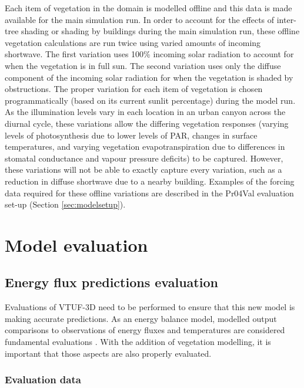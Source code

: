 \documentclass[final,3p,times,authoryear]{elsarticle}
\begin{document}
Each item of vegetation in the domain is modelled offline and this data is made available for the main simulation run. In order to account for the effects of inter-tree shading or shading by buildings during the main simulation run, these offline vegetation calculations are run twice using varied amounts of incoming shortwave. The first variation uses 100\% incoming solar radiation to account for when the vegetation is in full sun. The second variation uses only the diffuse component of the incoming solar radiation for when the vegetation is shaded by obstructions. The proper variation for each item of vegetation is chosen programmatically (based on its current sunlit percentage) during the model run. As the illumination levels vary in each location in an urban canyon across the diurnal cycle, these variations allow the differing vegetation responses (varying levels of photosynthesis due to lower levels of PAR, changes in surface temperatures, and varying vegetation evapotranspiration due to differences in stomatal conductance and vapour pressure deficits) to be captured. However, these variations will not be able to exactly capture every variation, such as a reduction in diffuse shortwave due to a nearby building. Examples of the forcing data required for these offline variations are described in the Pr04Val evaluation set-up (Section \ref{sec:modelsetup}).

\section{Model evaluation}\label{sec:Validation}
\subsection{Energy flux predictions evaluation}\label{sec:PrestonValidation}
Evaluations of VTUF-3D need to be performed to ensure that this new model is making accurate predictions. As an energy balance model, modelled output comparisons to observations of energy fluxes and temperatures are considered fundamental evaluations \citep{Masson2002a}. With the addition of vegetation modelling, it is important that those aspects are also properly evaluated. 

\subsubsection{Evaluation data}
\end{document}
